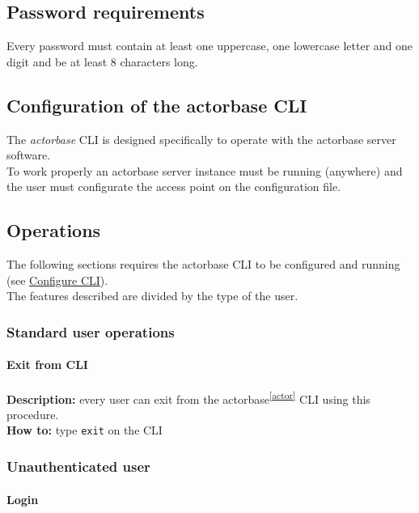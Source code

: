 \documentclass{scalatekids-article}
\begin{document}
\subsection{Password requirements}
\label{sec:passwordrequirement}
Every password must contain at least one uppercase, one lowercase letter and one
digit and be at least 8 characters long.

\subsection{Configuration of the actorbase CLI}
\label{sec:configurationcli}
The \textit{actorbase} CLI is designed specifically to operate
with the actorbase server software.\\
To work properly an actorbase server instance must be running
(anywhere) and the user must configurate the access point on the configuration file.

\subsection{Operations}

The following sections requires the actorbase CLI to be configured and
running (see \hyperref[sec:configurationcli]{Configure CLI}).\\
The features described are divided by the type of the user.

\subsubsection{Standard user operations}
\label{sec:everyuser}
\paragraph{Exit from CLI}

\textbf{Description:} every user can exit from the actorbase\textsuperscript{\ref{actor}} CLI
using this procedure.\\
\textbf{How to:} type \texttt{exit} on the CLI

\subsubsection{Unauthenticated user}
\label{sec:unauthenticateduser}

\paragraph{Login}
\end{document}

